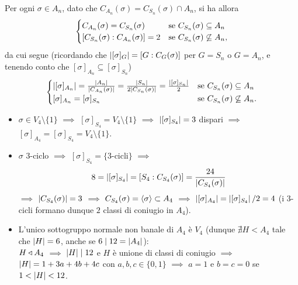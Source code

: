 Per ogni $\sigma\in A_n$, dato che $ C_{A_n}(\sigma)= C_{S_n}(\sigma)\cap A_n$, si ha allora
\[
\begin{cases} C_{A_n}(\sigma)= C_{S_n}(\sigma) & \text{se $ C_{S_n}(\sigma)\subseteq A_n$} \\
[ C_{S_n}(\sigma): C_{A_n}(\sigma)]=2 & \text{se $ C_{S_n}(\sigma)\not\subseteq A_n$},
\end{cases}
\]
da cui segue (ricordando che $\left\lvert[\sigma]_G\right\rvert=[G: C_G(\sigma)]$ per $G=S_n$ o $G=A_n$, e tenendo conto che $[\sigma]_{A_n}\subseteq[\sigma]_{S_n}$)
\[
\begin{cases}
\left\lvert[\sigma]_{A_n}\right\rvert=\frac{\left\lvert A_n\right\rvert}{\left\lvert C_{A_n}(\sigma)\right\rvert}=\frac{\left\lvert S_n\right\rvert}{2\left\lvert C_{S_n}(\sigma)\right\rvert}=\frac{\left\lvert[\sigma]_{S_n}\right\rvert}{2} & \text{se $ C_{S_n}(\sigma)\subseteq A_n$} \\
[\sigma]_{A_n}=[\sigma]_{S_n} & \text{se $ C_{S_n}(\sigma)\not\subseteq A_n$}.
\end{cases}
\]


\begin{itemize}
\item $\sigma\in V_4\setminus\{1\}$ $\implies$ $[\sigma]_{S_4}=V_4\setminus\{1\}$ $\implies$ $\left\lvert[\sigma]_{S_4}\right\rvert=3$ dispari $\implies$ $[\sigma]_{A_4}=[\sigma]_{S_4}=V_4\setminus\{1\}$.
\item $\sigma$ $3$-ciclo $\implies$ $[\sigma]_{S_4}=\{\text{$3$-cicli}\}$ $\implies$
\[
8=\left\lvert[\sigma]_{S_4}\right\rvert=[S_4: C_{S_4}(\sigma)]=\frac{24}{\left\lvert C_{S_4}(\sigma)\right\rvert}
\]
$\implies$ $\left\lvert C_{S_4}(\sigma)\right\rvert=3$ $\implies$ $ C_{S_4}(\sigma)=\left\langle\sigma\right\rangle\subset A_4$ $\implies$ $\left\lvert[\sigma]_{A_4}\right\rvert=\left\lvert[\sigma]_{S_4}\right\rvert/2=4$ (i $3$-cicli formano dunque $2$ classi di coniugio in $A_4$).
\item L'unico sottogruppo normale non banale di $A_4$ è $V_4$ (dunque $\nexists H<A_4$ tale che $\left\lvert H\right\rvert=6$, anche se $6\mid12=\left\lvert A_4\right\rvert$): \\
$H \triangleleft A_4$ $\implies$ $\left\lvert H\right\rvert\mid12$ e $H$ è unione di classi di coniugio $\implies$ $\left\lvert H\right\rvert=1+3a+4b+4c$ con $a,b,c\in\{0,1\}$ $\implies$ $a=1$ e $b=c=0$ se $1<\left\lvert H\right\rvert<12$.
\end{itemize}



